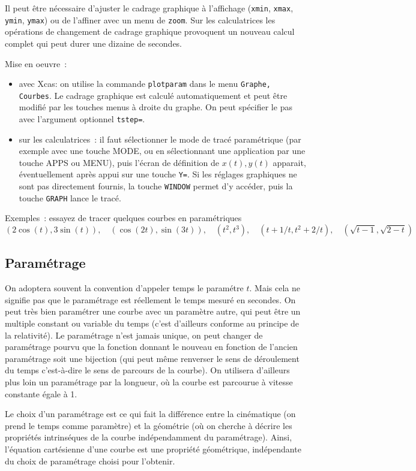 \documentclass[a4paper,11pt]{article}
\begin{document}
Il peut \^etre n\'ecessaire d'ajuster le cadrage graphique
\`a l'affichage (\verb|xmin|, \verb|xmax|, \verb|ymin|, \verb|ymax|) ou
de l'affiner avec un menu de \verb|zoom|. Sur les calculatrices
les op\'erations de changement de cadrage graphique
provoquent un nouveau calcul complet qui peut durer une
dizaine de secondes.

Mise en oeuvre~:
\begin{itemize}
\item avec Xcas: on utilise la commande \verb|plotparam|
dans le menu \verb|Graphe, Courbes|. Le cadrage
graphique est calcul\'e automatiquement et peut \^etre
modifi\'e par les touches menus \`a droite du graphe.
On peut sp\'ecifier le pas avec l'argument optionnel \verb|tstep=|.
\item sur les calculatrices~: il faut s\'electionner le mode
de trac\'e param\'etrique (par exemple avec une touche MODE,
ou en s\'electionnant une application par une touche 
APPS ou MENU), puis l'\'ecran de d\'efinition
de $x(t),y(t)$ apparait, \'eventuellement apr\`es appui
sur une touche \verb|Y=|. Si les r\'eglages graphiques
ne sont pas directement fournis, la touche \verb|WINDOW|
permet d'y acc\'eder, puis la touche \verb|GRAPH| lance
le trac\'e.
\end{itemize}

Exemples~: essayez de tracer quelques courbes en param\'etriques
$$ (2\cos(t),3\sin(t)), \quad (\cos(2t),\sin(3t)), \quad (t^2,t^3),
\quad (t+1/t, t^2+2/t), \quad (\sqrt{t-1},\sqrt{2-t}) $$

\subsection{Param\'etrage}
On adoptera souvent la convention d'appeler temps le param\'etre $t$.
Mais cela ne signifie pas que le param\'etrage est r\'eellement le
temps mesur\'e en secondes. On peut tr\`es bien param\'etrer une
courbe avec un param\`etre autre, qui peut \^etre un multiple 
constant ou variable du temps (c'est d'ailleurs conforme au
principe de la relativit\'e). Le param\'etrage n'est jamais unique,
on peut changer de param\'etrage pourvu que la fonction donnant
le nouveau en fonction de l'ancien param\'etrage soit une bijection
(qui peut m\^eme renverser le sens de d\'eroulement du temps
c'est-\`a-dire le sens de parcours de la courbe). On utilisera
d'ailleurs plus loin un param\'etrage par la longueur,
o\`u la courbe est parcourue \`a vitesse constante \'egale \`a 1.

Le choix d'un param\'etrage est ce qui fait la diff\'erence
entre la cin\'ematique (on prend le temps comme param\`etre) et la 
g\'eom\'etrie
(o\`u on cherche \`a d\'ecrire les propri\'et\'es intrins\'eques
de la courbe ind\'ependamment
du param\'etrage). Ainsi, l'\'equation cart\'esienne d'une courbe
est une propri\'et\'e g\'eom\'etrique, ind\'ependante du choix
de param\'etrage choisi pour l'obtenir. 
\end{document}
